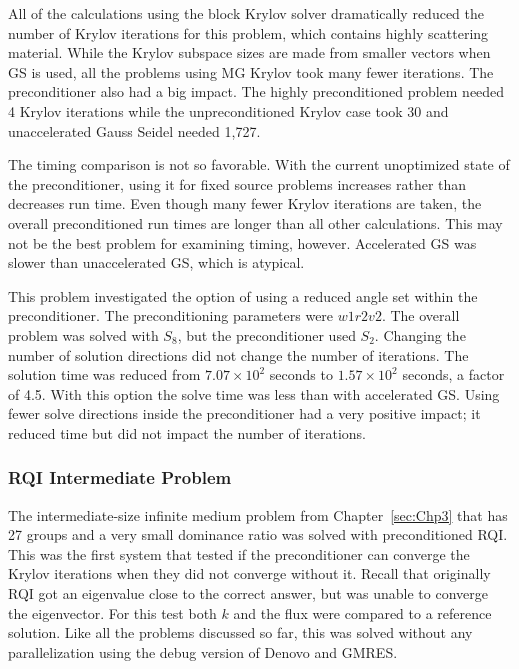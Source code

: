 All of the calculations using the block Krylov solver dramatically reduced the number of Krylov iterations for this problem, which contains highly scattering material. While the Krylov subspace sizes are made from smaller vectors when GS is used, all the problems using MG Krylov took many fewer iterations. The preconditioner also had a big impact. The highly preconditioned problem needed 4 Krylov iterations while the unpreconditioned Krylov case took 30 and unaccelerated Gauss Seidel needed 1,727.  

The timing comparison is not so favorable. With the current unoptimized state of the preconditioner, using it for fixed source problems increases rather than decreases run time. Even though many fewer Krylov iterations are taken, the overall preconditioned run times are longer than all other calculations. This may not be the best problem for examining timing, however. Accelerated GS was slower than unaccelerated GS, which is atypical.

This problem investigated the option of using a reduced angle set within the preconditioner. The preconditioning parameters were $w1r2v2$. The overall problem was solved with $S_{8}$, but the preconditioner used $S_{2}$. Changing the number of solution directions did not change the number of iterations. The solution time was reduced from $7.07 \times 10^{2}$ seconds to $1.57 \times 10^{2}$ seconds, a factor of 4.5. With this option the solve time was less than with accelerated GS. Using fewer solve directions inside the preconditioner had a very positive impact; it reduced time but did not impact the number of iterations.

\subsubsection{RQI Intermediate Problem}
The intermediate-size infinite medium problem from Chapter~\ref{sec:Chp3} that has 27 groups and a very small dominance ratio was solved with preconditioned RQI. This was the first system that tested if the preconditioner can converge the Krylov iterations when they did not converge without it. Recall that originally RQI got an eigenvalue close to the correct answer, but was unable to converge the eigenvector. For this test both $k$ and the flux were compared to a reference solution. Like all the problems discussed so far, this was solved without any parallelization using the debug version of Denovo and GMRES. 

